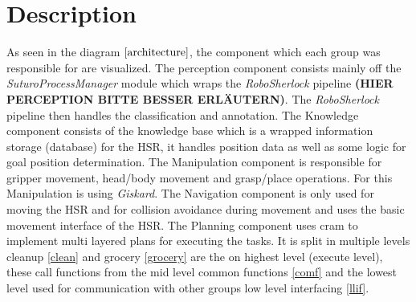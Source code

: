 \documentclass[main.tex]{subfiles}
\begin{document}
		\section{Description}
			As seen in the diagram \(\ref{architecture}\), the component which each group was responsible for are visualized. The perception component consists mainly off the \textit{SuturoProcessManager} module which wraps the \textit{RoboSherlock} pipeline \textbf{(HIER PERCEPTION BITTE BESSER ERLÄUTERN)}. The \textit{RoboSherlock} pipeline then handles the classification and annotation. The Knowledge component consists of the knowledge base which is a wrapped information storage (database) for the HSR, it handles position data as well as some logic for goal position determination. The Manipulation component is responsible for gripper movement, head/body movement and grasp/place operations. For this Manipulation is using \textit{Giskard}. The Navigation component is only used for moving the HSR and for collision avoidance during movement and uses the basic movement interface of the HSR. The Planning component uses cram to implement multi layered plans for executing the tasks. It is split in multiple levels cleanup \ref{clean} and grocery \ref{grocery} are the on highest level (execute level), these call functions from the mid level common functions \ref{comf} and the lowest level used for communication with other groups low level interfacing \ref{llif}.
\end{document}
